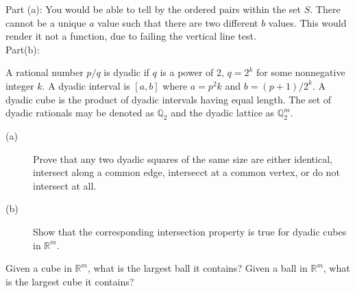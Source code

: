 \documentclass[11pt]{article}
\begin{document}
\begin{solution}
    Part (a): You would be able to tell by the ordered pairs within the set $S$. There cannot be a unique $a$ value such that there are two different $b$ values. This would render it not a function, due to failing the vertical line test.  \\ 
    Part(b): 
\end{solution}


\begin{exercise}
A rational number $p/q$ is dyadic if $q$ is a power of 2, $q=2^k$ for some nonnegative integer $k$. A dyadic interval is $[a,b]$ where $a = p^2k$ and $b=(p+1)/2^k$. A dyadic cube is the product of dyadic intervals having equal length. The set of dyadic rationals may be denoted as $\mathbb{Q}_2$ and the dyadic lattice as $\mathbb{Q}_2^m$.
\begin{description}
    \item[(a)] Prove that any two dyadic squares of the same size are either identical, intersect along a common edge, intersecct at a common vertex, or do not intersect at all. 
    \item[(b)] Show that the corresponding intersection property is true for dyadic cubes in $\mathbb{R}^m$.
\end{description}
\end{exercise}
\begin{solution}
    
\end{solution}


\begin{exercise}
    Given a cube in $\mathbb{R}^m$, what is the largest ball it contains? Given a ball in $\mathbb{R}^m$, what is the largest cube it contains? 
\end{exercise}
\begin{solution}
    
\end{solution}

\end{document}

